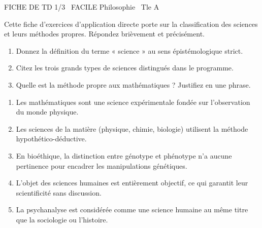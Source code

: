 \documentclass[11pt]{article}
\begin{document}
\begin{tcolorbox}[enhanced,colback=popink,colframe=popink,arc=10pt,boxrule=0pt,left=12pt,right=12pt,top=9pt,bottom=9pt]
{\color{white}\popxbold\small FICHE DE TD 1/3 \textbullet\ FACILE \hfill Philosophie \textbullet\ Tle A\par}
\end{tcolorbox}
\vspace{4pt}
\noindent Cette fiche d'exercices d'application directe porte sur la classification des sciences et leurs méthodes propres. Répondez brièvement et précisément.

\begin{exercice}
\begin{enumerate}
    \item Donnez la définition du terme « science » au sens épistémologique strict.
    \item Citez les trois grands types de sciences distingués dans le programme.
    \item Quelle est la méthode propre aux mathématiques ? Justifiez en une phrase.
\end{enumerate}
\end{exercice}

\begin{exercice}
\begin{enumerate}
    \item Les mathématiques sont une science expérimentale fondée sur l'observation du monde physique.
    \item Les sciences de la matière (physique, chimie, biologie) utilisent la méthode hypothético-déductive.
    \item En bioéthique, la distinction entre génotype et phénotype n'a aucune pertinence pour encadrer les manipulations génétiques.
    \item L'objet des sciences humaines est entièrement objectif, ce qui garantit leur scientificité sans discussion.
    \item La psychanalyse est considérée comme une science humaine au même titre que la sociologie ou l'histoire.
\end{enumerate}
\end{exercice}
\end{document}
